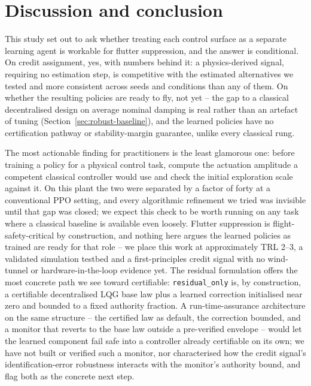 \documentclass[preprint,11pt]{elsarticle}
\begin{document}
\section{Discussion and conclusion}
\label{sec:discussion}

This study set out to ask whether treating each control surface as a
separate learning agent is workable for flutter suppression, and the
answer is conditional. On credit assignment, yes, with numbers behind it:
a physics-derived signal, requiring no estimation step, is competitive
with the estimated alternatives we tested and more consistent across seeds
and conditions than any of them. On whether the resulting policies are
ready to fly, not yet -- the gap to a classical decentralised design on
average nominal damping is real rather than an artefact of tuning
(Section~\ref{sec:robust-baseline}), and the learned policies have no
certification pathway or stability-margin guarantee, unlike every
classical rung.

The most actionable finding for practitioners is the least glamorous one:
before training a policy for a physical control task, compute the
actuation amplitude a competent classical controller would use and check
the initial exploration scale against it. On this plant the two were
separated by a factor of forty at a conventional PPO setting, and every
algorithmic refinement we tried was invisible until that gap was closed;
we expect this check to be worth running on any task where a classical
baseline is available even loosely. Flutter suppression is
flight-safety-critical by construction, and nothing here argues the
learned policies as trained are ready for that role -- we place this work
at approximately TRL 2--3, a validated simulation testbed and a
first-principles credit signal with no wind-tunnel or hardware-in-the-loop
evidence yet. The residual formulation offers the most concrete path we
see toward certifiable: \texttt{residual\_only} is, by construction, a
certifiable decentralised LQG base law plus a learned correction
initialised near zero and bounded to a fixed authority fraction. A
run-time-assurance architecture on the same structure -- the certified law
as default, the correction bounded, and a monitor that reverts to the base
law outside a pre-verified envelope -- would let the learned component
fail safe into a controller already certifiable on its own; we have not
built or verified such a monitor, nor characterised how the credit
signal's identification-error robustness interacts with the monitor's
authority bound, and flag both as the concrete next step.
\end{document}

